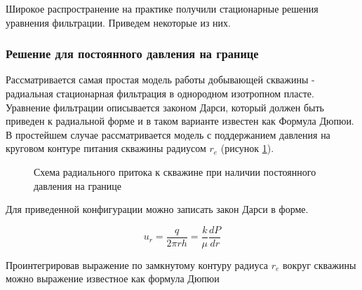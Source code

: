 Широкое распространение на практике получили стационарные решения уравнения фильтрации. Приведем некоторые из них.

\subsubsection{Решение для постоянного давления на границе}

Рассматривается самая простая модель работы добывающей скважины - радиальная стационарная фильтрация в однородном изотропном пласте. 
Уравнение фильтрации описывается законом Дарси, который должен быть приведен к радиальной форме и в таком варианте известен как Формула Дюпюи.  В простейшем случае рассматривается модель с поддержанием давления на круговом контуре питания скважины радиусом $r_e$ (рисунок \ref{ris:radial_inflow_steady_state_1}).

\begin{figure}[h!]
	\begin{center}
		
		\caption{Схема радиального притока к скважине при наличии постоянного давления на границе}
		\label{ris:radial_inflow_steady_state_1}
	\end{center}
\end{figure}


Для приведенной конфигурации можно записать закон Дарси в форме.

$$u_r=\frac{q}{2\pi rh}=\frac{k}{\mu}\frac{dP}{dr}$$

Проинтегрировав выражение по замкнутому контуру радиуса $r_e$ вокруг скважины можно выражение известное как формула Дюпюи

